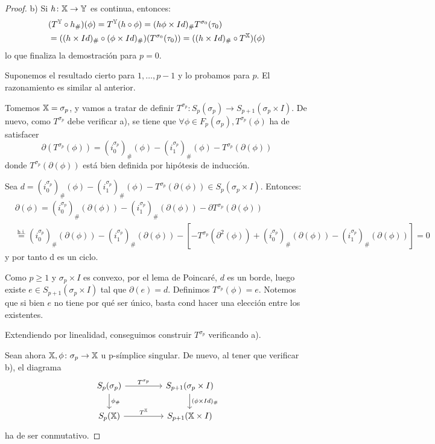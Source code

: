 \begin{proof}
  b) Si $h \colon {\mathbb X} \to {\mathbb Y}$ es continua, entonces:
  \begin{align*}
    &(T^{\mathbb Y} \circ h_\#)(\phi) = T^{\mathbb Y}(h \circ \phi) = (h\phi \times Id)_\# T^{\sigma_0}(\tau_0) \\
    &= ((h \times Id)_\# \circ (\phi \times Id)_\#) (T^{\sigma_0}(\tau_0)) = ((h \times Id)_\# \circ T^{\mathbb X})(\phi)
  \end{align*}
  lo que finaliza la demostración para $p = 0$.

  Suponemos el resultado cierto para $1, \dots, p-1$ y lo probamos para $p$. El razonamiento es similar al anterior.

  Tomemos ${\mathbb X} = \sigma_p$, y vamos a tratar de definir $T^{\sigma_p} \colon S_p(\sigma_p) \to S_{p+1}(\sigma_p \times I)$.
  De nuevo, como $T^{\sigma_p}$ debe verificar a), se tiene que $\forall \phi \in F_p(\sigma_p), T^{\sigma_p}(\phi)$ ha de satisfacer
  \[ \partial(T^{\sigma_p}(\phi)) = (i_0^{\sigma_p})_\# (\phi) - (i_1^{\sigma_p})_\# (\phi) - T^{\sigma_p}(\partial(\phi)) \]
  donde $T^{\sigma_p}(\partial(\phi))$ está bien definida por hipótesis de inducción.

  Sea $d = (i_0^{\sigma_p})_\# (\phi) - (i_1^{\sigma_p})_\# (\phi) - T^{\sigma_p}(\partial(\phi)) \in S_p(\sigma_p \times I)$.
  Entonces:
  \begin{align*}
    &\partial(\phi) = (i_0^{\sigma_p})_\# (\partial(\phi)) - (i_1^{\sigma_p})_\# (\partial(\phi)) - \partial T^{\sigma_p}(\partial(\phi)) \\
    &\stackrel{\text{h.i.}}{=} (i_0^{\sigma_p})_\#(\partial(\phi)) - (i_1^{\sigma_p})_\#(\partial(\phi)) - [ - T^{\sigma_p}(\partial^2(\phi)) +
    (i_0^{\sigma_p})_\#(\partial(\phi)) - (i_1^{\sigma_p})_\#(\partial(\phi)) ] = 0
  \end{align*}
  y por tanto d es un ciclo.

  Como $p \geq 1$ y $\sigma_p \times I$ es convexo, por el lema de Poincaré, $d$ es un borde, luego existe $e \in S_{p+1}(\sigma_p \times I)$
  tal que $\partial(e) = d$. Definimos $T^{\sigma_p}(\phi) = e$. Notemos que si bien $e$ no tiene por qué ser único, basta cond hacer una elección
  entre los existentes.

  Extendiendo por linealidad, conseguimos construir $T^{\sigma_p}$ verificando a).

  Sean ahora ${\mathbb X}, \phi \colon \sigma_p \to {\mathbb X}$ u p-símplice singular. De nuevo, al tener que verificar b), el diagrama
  \[
  \begin{tikzcd}
    S_p(\sigma_p) \arrow{r}{T^{\sigma_p}} \arrow{d}{\phi_\#} & [2em] S_{p+1}(\sigma_p \times I) \arrow{d}{(\phi \times Id)_\#} \\
    \SX{p} \arrow{r}{T^\X}                 & S_{p+1}(\X \times I)
  \end{tikzcd}
  \]
  ha de ser conmutativo.


\end{proof}

